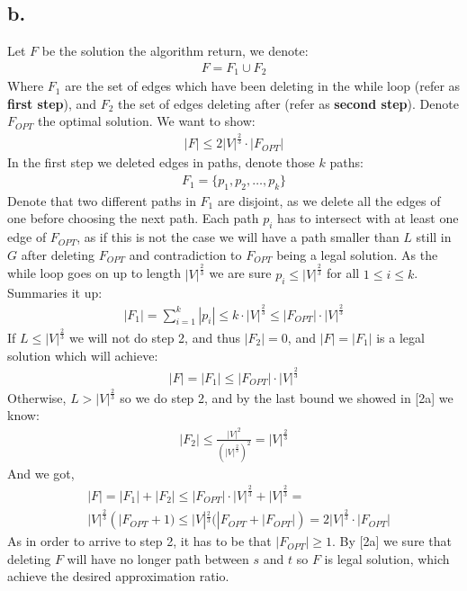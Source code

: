 \documentclass[11pt]{article}
\theoremstyle{plain}
\theoremstyle{nonumberplainnobrackets}
\begin{document}
\subsection*{b.}
Let $F$ be the solution the algorithm return, we denote:
\begin{align*}
	F= F_1 \cup F_2
\end{align*}
Where $F_1$ are the set of edges which have been deleting in the while loop (refer as \textbf{first step}), and $F_2$ the set of edges deleting after (refer as \textbf{second step}). Denote $F_{OPT}$ the optimal solution. We want to show:
\begin{align*}
|F| \le 2|V|^{\frac{2}{3}} \cdot |F_{OPT}|
\end{align*}
In the first step we deleted edges in paths, denote those $k$ paths:
\begin{align*}
F_1 = \{p_1,p_2,\ldots , p_k\}
\end{align*}
Denote that two different paths in $F_1$ are disjoint, as we delete all the edges of one before choosing the next path. Each path $p_i$ has to intersect with at least one edge of $F_{OPT}$, as if this is not the case we will have a path smaller than $L$ still in $G$ after deleting $F_{OPT}$ and contradiction to $F_{OPT}$ being a legal solution. As the while loop goes on up to length $|V|^{\frac{2}{3}} $ we are sure $p_i\le |V|^{\frac{2}{3}} $ for all $1\le i \le k$. Summaries it up:
\begin{align*}
|F_1| = \sum_{i=1}^k |p_i| \le k \cdot |V|^{\frac{2}{3}} \le |F_{OPT}| \cdot |V|^{\frac{2}{3}} 
\end{align*}
If $L\le |V|^{\frac{2}{3}} $ we will not do step 2, and thus $|F_2|=0$, and $|F|=|F_1|$ is a legal solution which will achieve:
\begin{align*}
|F| = |F_1| \le |F_{OPT}|\cdot |V|^{\frac{2}{3}} 
\end{align*}  
Otherwise, $L> |V|^{\frac{2}{3}} $ so we do step 2, and by the last bound we showed in [2a] we know:
\begin{align*}
|F_2| \le \frac{|V|^2 }{(|V|^{\frac{2}{3}} )^2} = |V|^{\frac{2}{3}} 
\end{align*} 
And we got, 
\begin{align*}
&|F| = |F_1|+|F_2| \le |F_{OPT}|\cdot |V|^{\frac{2}{3}} + |V|^{\frac{2}{3}} = \\
&|V|^{\frac{2}{3}} (|F_{OPT}+1)\le |V|^{\frac{2}{3}} (|F_{OPT}+|F_{OPT}|)= 2|V|^{\frac{2}{3}} \cdot |F_{OPT}|  
\end{align*} 
As in order to arrive to step 2, it has to be that $ |F_{OPT}| \ge 1$. By [2a] we sure that deleting $F$ will have no longer path between $s$ and $t$ so $F$ is legal solution, which achieve the desired approximation ratio.
\end{document}

